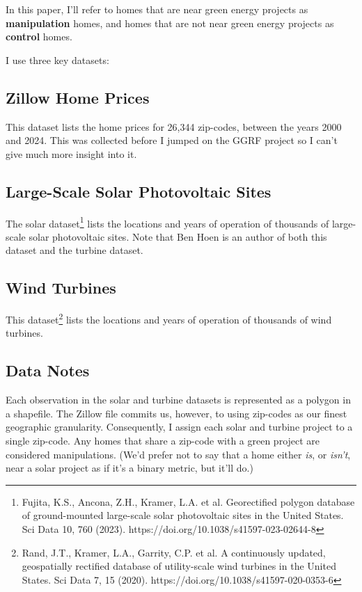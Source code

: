 \documentclass{article}
\begin{document}
In this paper, I'll  refer to homes that are near green energy projects as \textbf{manipulation} homes, and homes that are not near green energy projects as \textbf{control} homes.

I use three key datasets:

\subsection{Zillow Home Prices}
This dataset lists the home prices for 26,344 zip-codes, between the years 2000 and 2024.
This was collected before I jumped on the GGRF project so I can't give much more insight into it.

\subsection{Large-Scale Solar Photovoltaic Sites}
The solar dataset\footnote{Fujita, K.S., Ancona, Z.H., Kramer, L.A. et al. Georectified polygon database of ground-mounted large-scale solar photovoltaic sites in the United States. Sci Data 10, 760 (2023). https://doi.org/10.1038/s41597-023-02644-8} lists the locations and years of operation of thousands of large-scale solar photovoltaic sites.
Note that Ben Hoen is an author of both this dataset and the turbine dataset.

\subsection{Wind Turbines}
This dataset\footnote{
Rand, J.T., Kramer, L.A., Garrity, C.P. et al. A continuously updated, geospatially rectified database of utility-scale wind turbines in the United States. Sci Data 7, 15 (2020). https://doi.org/10.1038/s41597-020-0353-6} lists the locations and years of operation of thousands of wind turbines.

\subsection{Data Notes}
Each observation in the solar and turbine datasets is represented as a polygon in a shapefile.
The Zillow file commits us, however, to using zip-codes as our finest geographic granularity.
Consequently, I assign each solar and turbine project to a single zip-code. 
Any homes that share a zip-code with a green project are considered manipulations.
(We'd prefer not to say that a home either \emph{is}, or \emph{isn't}, near a solar project as if it's a binary metric, but it'll do.)
\end{document}
